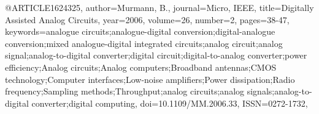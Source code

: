 @ARTICLE{1624325, 
author={Murmann, B.}, 
journal={Micro, IEEE}, title={Digitally Assisted Analog Circuits}, 
year={2006}, 
volume={26}, 
number={2}, 
pages={38-47}, 
keywords={analogue circuits;analogue-digital conversion;digital-analogue conversion;mixed analogue-digital integrated circuits;analog circuit;analog signal;analog-to-digital converter;digital circuit;digital-to-analog converter;power efficiency;Analog circuits;Analog computers;Broadband antennas;CMOS technology;Computer interfaces;Low-noise amplifiers;Power dissipation;Radio frequency;Sampling methods;Throughput;analog circuits;analog signals;analog-to-digital converter;digital computing}, 
doi={10.1109/MM.2006.33}, 
ISSN={0272-1732},}